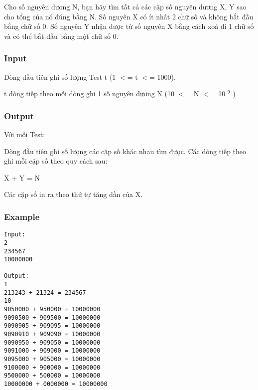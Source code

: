 



   Cho số nguyên dương N, bạn hãy tìm tất cả các cặp số nguyên dương X, Y sao cho tổng của nó đúng bằng N. Số nguyên X có ít nhất 2 chữ số và không bắt đầu bằng chữ số 0. Số nguyên Y nhận được từ số nguyên X bằng cách xoá đi 1 chữ số và có thể bắt đầu bằng một chữ số 0.  

\subsubsection{   Input  }

   Dòng đầu tiên ghi số lượng Test t (1 $<$= t $<$= 1000).  

   t dòng tiếp theo mỗi dòng ghi 1 số nguyên dương N (10 $<$= N $<$= 10   $^    9   $   )  

\subsubsection{   Output  }

   Với mỗi Test:  

   Dòng đầu tiên ghi số lượng các cặp số khác nhau tìm được.  Các dòng tiếp theo ghi mỗi cặp số theo quy cách sau:  

   X + Y = N  

   Các cặp số in ra theo thứ tự tăng dần của X.  

\subsubsection{   Example  }
\begin{verbatim}
Input:
2
234567
10000000

Output:
1
213243 + 21324 = 234567
10
9050000 + 950000 = 10000000
9090500 + 909500 = 10000000
9090905 + 909095 = 10000000
9090910 + 909090 = 10000000
9090950 + 909050 = 10000000
9091000 + 909000 = 10000000
9095000 + 905000 = 10000000
9100000 + 900000 = 10000000
9500000 + 500000 = 10000000
10000000 + 0000000 = 10000000

\end{verbatim}